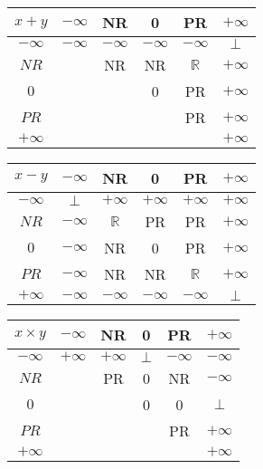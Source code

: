 \begin{tabular}{c||*{5}{c|}}
$x + y$
&$-\infty$&NR&0
&PR&$+\infty$\\\hline
$-\infty$ &$-\infty$&$-\infty$&$-\infty$&$-\infty$&$\bot$\\\hline
$NR$ &&NR&NR&$\mathbb{R}$&$+\infty$\\\hline
$0$&&&0&PR&$+\infty$\\\hline
$PR$ &&&&PR&$+\infty$\\\hline
$+\infty$ &&&&&$+\infty$\\\hline
\end{tabular}
\quad
\begin{tabular}{c||*{5}{c|}}
$x - y$
&$-\infty$&NR&0
&PR&$+\infty$\\\hline
$-\infty$ &$\bot$&$+\infty$&$+\infty$&$+\infty$&$+\infty$\\\hline
$NR$ &$-\infty$&$\mathbb{R}$&PR&PR&$+\infty$\\\hline
$0$&$-\infty$&NR&0&PR&$+\infty$\\\hline
$PR$ &$-\infty$&NR&NR&$\mathbb{R}$&$+\infty$\\\hline
$+\infty$ &$-\infty$&$-\infty$&$-\infty$&$-\infty$&$\bot$\\\hline
\end{tabular}
\newline
\vspace*{1 cm}
\newline
\begin{tabular}{c||*{5}{c|}}
$x \times y$
&$-\infty$&NR&0
&PR&$+\infty$\\\hline
$-\infty$ &$+\infty$&$+\infty$&$\bot$&$-\infty$&$-\infty$\\\hline
$NR$ &&PR&0&NR&$-\infty$\\\hline
$0$&&&0&0&$\bot$\\\hline
$PR$ &&&&PR&$+\infty$\\\hline
$+\infty$ &&&&&$+\infty$\\\hline
\end{tabular}

